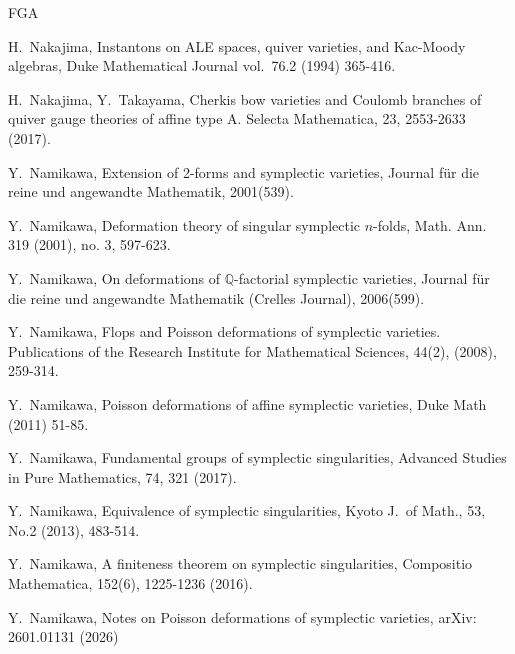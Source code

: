 \documentclass[12pt,a4paper]{amsart}
\theoremstyle{remark}
\theoremstyle{definition}
\def\Q{\mathbb{Q}}
\begin{document}
\begin{thebibliography}{FGA}


H.~Nakajima, 
Instantons on ALE spaces, quiver varieties, and Kac-Moody algebras, 
Duke Mathematical Journal vol.\ 76.2 (1994) 365-416. 


H.~Nakajima, Y.~Takayama, 
Cherkis bow varieties and Coulomb branches of quiver gauge theories of 
affine type A. Selecta Mathematica, 23, 2553-2633 (2017). 

Y.~Namikawa, Extension of 2-forms and symplectic varieties, 
Journal f\"ur die reine und angewandte Mathematik, 2001(539). 

Y.~Namikawa, 
Deformation theory of singular symplectic $n$-folds, Math. Ann. 319 (2001), no. 3, 597-623.

Y.~Namikawa, On deformations of $\Q$-factorial symplectic varieties, 
Journal f\"ur die reine und angewandte Mathematik (Crelles Journal),  
2006(599). 

Y.~Namikawa, 
Flops and Poisson deformations of symplectic varieties. Publications of the Research Institute for Mathematical Sciences, 44(2), (2008), 259-314.

Y.~Namikawa, 
Poisson deformations of affine symplectic varieties, 
Duke Math (2011) 51-85.

Y.~Namikawa, Fundamental groups of symplectic singularities, 
Advanced Studies in Pure Mathematics, 74, 321 (2017). 

Y.~Namikawa, 
Equivalence of symplectic singularities, 
Kyoto J.\ of Math., 53, No.2 (2013), 483-514. 

Y.~Namikawa, A finiteness theorem on symplectic singularities, 
Compositio Mathematica, 152(6), 1225-1236 (2016). 

Y.~Namikawa, Notes on Poisson deformations of symplectic varieties, 
arXiv: 2601.01131 (2026)



\end{thebibliography}
\end{document}
